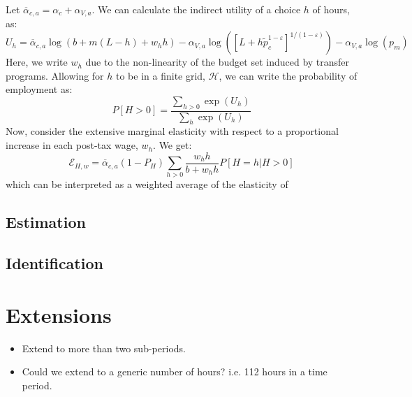 \documentclass[12pt]{article}
\newcommand\ov{\overline}
\newcommand\mc{\mathcal}
\numberwithin{equation}{section}
\numberwithin{figure}{section}
\numberwithin{table}{section}
\begin{document}
Let $\ov{\alpha}_{c,a} = \alpha_c + \alpha_{V,a}$. We can calculate the indirect utility of a choice $h$ of hours, as:
\[ U_h = \ov{\alpha}_{c,a}\log(b+m(L-h)+w_hh) - \alpha_{V,a}\log\left([L + h\tilde{p}_c^{1-\varepsilon}]^{1/(1-\varepsilon)}\right) - \alpha_{V,a}\log(p_m) \]
Here, we write $w_h$ due to the non-linearity of the budget set induced by transfer programs. Allowing for $h$ to be in a finite grid, $\mc{H}$, we can write the probability of employment as:
\[P[H>0] = \frac{\sum_{h>0}\exp(U_h)}{\sum_h\exp(U_h)} \]
Now, consider the extensive marginal elasticity with respect to a proportional increase in each post-tax wage, $w_h$. We get:
\[\mathcal{E}_{H,w}  = \ov{\alpha}_{c,a}(1-P_H)\sum_{h>0}\frac{w_hh}{b+w_hh}P[H=h|H>0] \]
which can be interpreted as a weighted average of the elasticity of
\subsection{Estimation}


\subsection{Identification}


\section{Extensions}
\begin{itemize}
\item Extend to more than two sub-periods.
\item Could we extend to a generic number of hours? i.e. 112 hours in a time period.
\end{itemize}

%
%

\end{document}
